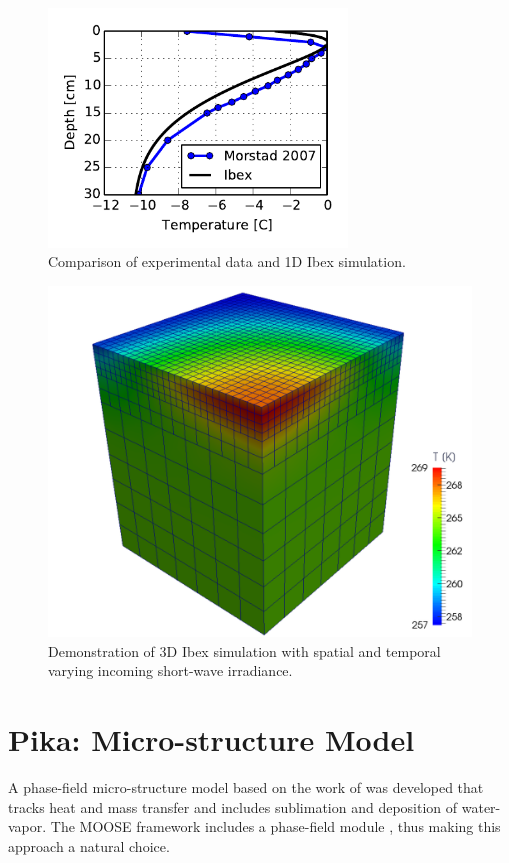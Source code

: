 \begin{figure}[t]
  \includegraphics[width=3.125in]{figures/ibex.pdf}
  \caption{Comparison of experimental data and 1D Ibex simulation.}
  \label{fig:ibex_1d}
\end{figure}

\begin{figure}[!ht]
  \includegraphics[width=\linewidth]{figures/ibex3d.pdf}
  \caption{Demonstration of 3D Ibex simulation with spatial and temporal varying incoming short-wave irradiance.}
  \label{fig:ibex_3d}
\end{figure}



\section{Pika: Micro-structure Model}\label{sec:pika}
A phase-field micro-structure model based on the work of \citet{kaempfer2009phase} was developed that tracks heat and mass transfer and includes sublimation and deposition of water-vapor. The MOOSE framework includes a phase-field module \citep{tonks2012object}, thus making this approach a natural choice.

